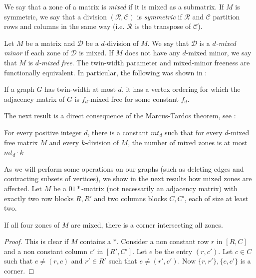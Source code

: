     We say that a zone of a matrix is \emph{mixed} if it is mixed as a submatrix.
    If $M$ is symmetric, we say that a division $(\mathcal{R}, \mathcal{C})$ is \emph{symmetric} if $\mathcal{R}$ and $\mathcal{C}$ partition rows and columns in the same way (i.e. $\mathcal{R}$ is the transpose of $\mathcal{C}$).
    
    Let $M$ be a matrix and $\mathcal{D}$ be a $d$-division of $M$. We say that $\mathcal{D}$ is a \emph{$d$-mixed minor} if each zone of $\mathcal{D}$ is mixed. If $M$ does not have any $d$-mixed minor, we say that $M$ is \emph{$d$-mixed free}. The twin-width parameter and mixed-minor freeness are functionally equivalent. In particular, the following was shown in \cite{BKTW21}:

    
    \begin{lemma}\label{lem:mixedtww}
    If a graph $G$ has twin-width at most $d$, it has a vertex ordering for which the adjacency matrix of $G$ is $f_d$-mixed free for some constant $f_d$.
    \end{lemma}
    

    The next result is a direct consequence of the Marcus-Tardos theorem, see \cite{MT04}:

\begin{theorem}\label{th:marcustardos}
    For every positive integer $d$, there is a constant $mt_d$ such that for every $d$-mixed free matrix $M$ and every $k$-division of $M$, the number of mixed zones is at most $mt_d \cdot k$
\end{theorem}


As we will perform some operations on our graphs (such as deleting edges and contracting subsets of vertices), we show in the next results how mixed zones are affected. Let $M$ be a $01*$-matrix (not necessarily an adjacency matrix) with exactly two row blocks $R,R'$ and two columns blocks $C,C'$, each of size at least two. 

\begin{lemma}\label{lem:4corner}
If all four zones of $M$ are mixed, there is a corner intersecting all zones.
\end{lemma}

\begin{proof}
This is clear if $M$ contains a $*$. Consider a non constant row $r$ in $[R,C]$ and a non constant column $c'$ in $[R',C']$. Let $e$ be the entry $(r,c')$. Let $c\in C$ such that $e\neq (r,c)$ and $r'\in R'$ such that $e\neq (r',c')$. Now $\{r,r'\},\{c,c'\}$ is a corner.
\end{proof}

